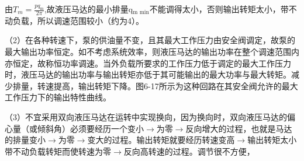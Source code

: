 由$T_m=\frac{pq_\text{m}}{2\pi}$,故液压马达的最小排量q$_\text{m min}$不能调得太小，否则输出转矩太小，带不动负载，所以调速范围较小（约为4）。

（2）在各种转速下，泵的供油量不变，且其最大工作压力由安全阀调定，故泵的最大输出功率恒定。如不考虑系统效率，则液压马达的输出功率在整个调速范围内亦恒定，故称恒功率调速。当外负载所要求的工作压力低于调定的最大工作压力时，液压马达的输出功率与输出转矩亦低于其可能输出的最大功率与最大转矩。减少排量，转速提高，输出转矩下降。图6-17所示为这种回路在其安全阀允许的最大工作压力下的输出特性曲线。

（3）不宜采用双向液压马达在运转中实现换向，因为换向时，双向液压马达的偏心量（或倾斜角）必须要经历一个变小$\rightarrow$为零$\rightarrow$反向增大的过程，也就是马达的排量变小$\rightarrow$为零$\rightarrow$变大的过程。输出转矩就要经历转速变高$\rightarrow$输出转矩太小带不动负载转矩而使转速为零$\rightarrow$反向高转速的过程。调节很不方便，

